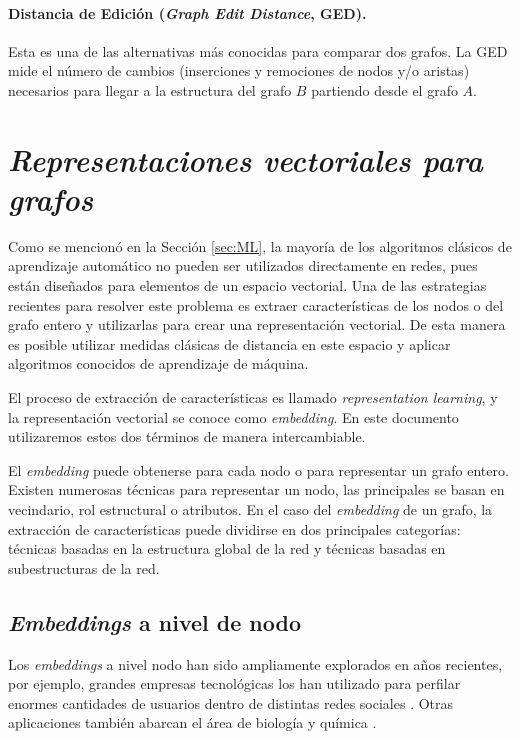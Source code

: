 \paragraph{Distancia de Edición (\textit{Graph Edit Distance}, GED).} Esta es una de las alternativas más conocidas para comparar dos grafos. La GED mide el número de cambios (inserciones y remociones de nodos y/o aristas) necesarios para llegar a la estructura del grafo $B$ partiendo desde el grafo $A$. 

\section{\textit{Representaciones vectoriales para grafos}}
Como se mencionó en la Sección \ref{sec:ML}, la mayoría de los algoritmos clásicos de aprendizaje automático no pueden ser utilizados directamente en redes, pues están diseñados para elementos de un espacio vectorial. Una de las estrategias recientes para resolver este problema es extraer características de los nodos o del grafo entero y utilizarlas para crear una representación vectorial. De esta manera es posible utilizar medidas clásicas de distancia en este espacio y aplicar algoritmos conocidos de aprendizaje de máquina. 

El proceso de extracción de características es llamado {\it representation learning}, y la representación vectorial se conoce como \textit{embedding}. En este documento utilizaremos estos dos términos de manera intercambiable.

El \textit{embedding} puede obtenerse para cada nodo o para representar un grafo entero. Existen numerosas técnicas para representar un nodo, las principales se basan en vecindario, rol estructural o atributos. En el caso del \textit{embedding} de un grafo, la extracción de características puede dividirse en dos principales categorías: técnicas basadas en la estructura global de la red y técnicas basadas en subestructuras de la red.

\subsection{\textit{Embeddings} a nivel de nodo}
Los \textit{embeddings} a nivel nodo han sido ampliamente explorados en años recientes, por ejemplo, grandes empresas tecnológicas los han utilizado para perfilar enormes cantidades de usuarios dentro de distintas redes sociales \cite{lerer_pytorch-biggraph_2019}. Otras aplicaciones también abarcan el área de biología y química \cite{yue_graph_2020}.

